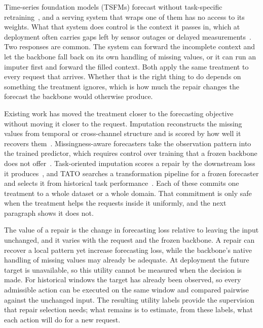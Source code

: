 \documentclass{article}
\newcommand{\tsfm}{TSFM}
\begin{document}
Time-series foundation models (\tsfm{}s) forecast without task-specific
retraining~\citep{ansari2024chronos,chronosbolt2025,das2024timesfm,woo2024moirai,chronos2_2025},
and a serving system that wraps one of them has no access to its weights. What that system
does control is the context it passes in, which at deployment often carries gaps left by
sensor outages or delayed measurements~\citep{chen2024bitgraph,peng2025s4m}. Two responses are
common. The system can forward the incomplete context and let the backbone fall back on its
own handling of missing values, or it can run an imputer first and forward the filled context.
Both apply the same treatment to every request that arrives. Whether that is the right thing
to do depends on something the treatment ignores, which is how much the repair changes the
forecast the backbone would otherwise produce.

Existing work has moved the treatment closer to the forecasting objective without moving it
closer to the request. Imputation reconstructs the missing values from temporal or
cross-channel structure and is scored by how well it recovers
them~\citep{cao2018brits,tashiro2021csdi,du2023saits}. Missingness-aware forecasters take the
observation pattern into the trained predictor, which requires control over training that a
frozen backbone does not offer~\citep{chen2024bitgraph,peng2025s4m}. Task-oriented imputation
scores a repair by the downstream loss it
produces~\citep{wang2024taskoriented,hao2025toivsf,xu2026srdi}, and TATO searches a
transformation pipeline for a frozen forecaster and selects it from historical task
performance~\citep{qiu2026tato}. Each of these commits one treatment to a whole dataset or a
whole domain. That commitment is only safe when the treatment helps the requests inside it
uniformly, and the next paragraph shows it does not.

The value of a repair is the change in forecasting loss relative to leaving the input
unchanged, and it varies with the request and the frozen backbone. A repair can recover a
local pattern yet increase forecasting loss, while the backbone's native handling of missing
values may already be adequate. At deployment the future target is unavailable, so this
utility cannot be measured when the decision is made. For historical windows the target has
already been observed, so every admissible action can be executed on the same window and
compared pairwise against the unchanged input. The resulting utility labels provide the
supervision that repair selection needs; what remains is to estimate, from these labels, what
each action will do for a new request.
\end{document}
